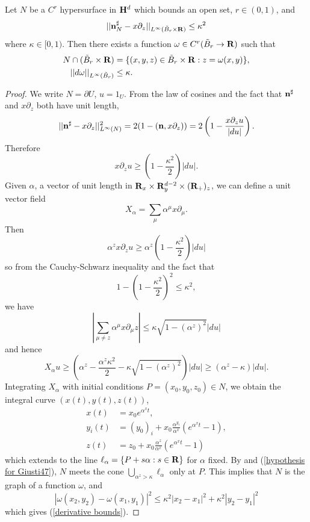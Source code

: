 \begin{lemma}\label{hopfKilling}
Let $N$ be a $C^r$ hypersurface in $\mathbf H^d$ which bounds an open set, $r \in (0, 1)$, and
\begin{equation}\label{kappa-correct alignment}
||\mathbf n_N^\sharp - x\partial_z||_{L^\infty(\tilde B_r \times \mathbf{R})} \leq \kappa^2
\end{equation}
where $\kappa \in [0, 1)$.
Then there exists a function $\omega \in C^r(\tilde B_r \to \mathbf{R})$
such that
\begin{align}
    N \cap (\tilde B_r \times \mathbf{R}) &= \{(x, y, z) \in \tilde B_r\times \mathbf{R}: z = \omega(x, y)\}, \label{N is a graph}\\
    ||d\omega||_{L^\infty(\tilde B_r)} &\leq \kappa. \label{derivative bounds}
\end{align}
\end{lemma}
\begin{proof}
We write $N = \partial U$, $u = 1_U$.
From the law of cosines and the fact that $\mathbf n^\sharp$ and $x\partial_z$ both have unit length,
$$||\mathbf n^\sharp - x\partial_z||_{L^\infty(N)}^2 = 2(1 - (\mathbf n, x\partial_z)) = 2\left(1 - \frac{x\partial_z u}{|du|}\right).$$
Therefore
$$x\partial_z u \geq \left(1 - \frac{\kappa^2}{2}\right) |du|.$$
Given $\alpha$, a vector of unit length in $\mathbf{R}_x \times \mathbf{R}^{d - 2}_y \times (\mathbf{R}_+)_z$, we can define a unit vector field
$$X_\alpha = \sum_\mu \alpha^\mu x\partial_\mu.$$
Then
$$\alpha^z x\partial_z u \geq \alpha^z \left(1 - \frac{\kappa^2}{2}\right) |du|$$
so from the Cauchy-Schwarz inequality and the fact that
$$1 - \left(1 - \frac{\kappa^2}{2}\right)^2 \leq \kappa^2,$$
we have
$$\left|\sum_{\mu \neq z} \alpha^\mu x\partial_\mu z\right| \leq \kappa\sqrt{1 - (\alpha^z)^2} |du|$$
and hence
\begin{equation}\label{hypothesis for Giusti47}
X_\alpha u \geq \left(\alpha^z - \frac{\alpha^z \kappa^2}{2} - \kappa\sqrt{1 - (\alpha^z)^2}\right)|du| \geq (\alpha^z - \kappa)|du|.
\end{equation}
Integrating $X_\alpha$ with initial conditions $P = (x_0, y_0, z_0) \in N$, we obtain the integral curve $(x(t), y(t), z(t))$,
\begin{align*}
x(t) &= x_0 e^{\alpha^x t}, \\
y_i(t) &= (y_0)_i + x_0 \frac{\alpha^{y_i}}{\alpha^x}(e^{\alpha^x t} - 1),\\
z(t) &= z_0 + x_0 \frac{\alpha^z}{\alpha^x}(e^{\alpha^x t} - 1)
\end{align*}
which extends to the line $\ell_\alpha = \{P + s\alpha: s \in \mathbf{R}\}$ for $\alpha$ fixed.
By \cite[Remark 4.7]{Giusti77} and (\ref{hypothesis for Giusti47}), $N$ meets the cone $\bigcup_{\alpha^z > \kappa} \ell_\alpha$
only at $P$. This implies that $N$ is the graph of a function $\omega$, and
$$|\omega(x_2, y_2) - \omega(x_1, y_1)|^2 \leq \kappa^2 |x_2 - x_1|^2 + \kappa^2 |y_2 - y_1|^2$$
which gives (\ref{derivative bounds}).
\end{proof}


